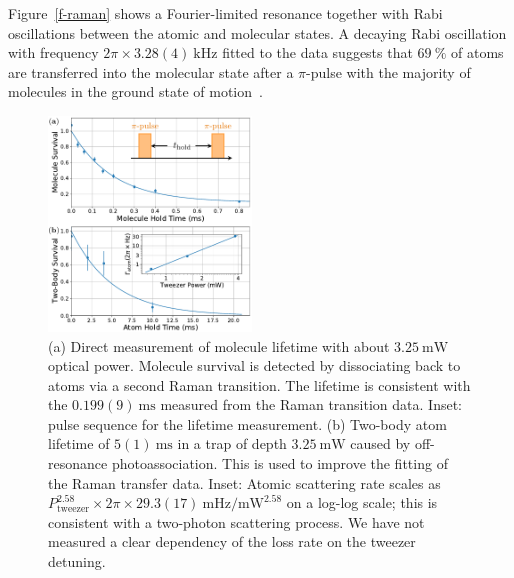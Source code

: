 \documentclass[aps,prl,twocolumn,10pt,superscriptaddress]{revtex4-1}
\begin{document}
Figure~\ref{f-raman} shows a Fourier-limited resonance together with Rabi oscillations between the atomic and molecular states.
A decaying Rabi oscillation with frequency $2\pi\times3.28(4)~\mathrm{kHz}$ fitted to the data suggests that
$69~\mathrm{\%}$ of atoms are transferred into the molecular state after a $\pi$-pulse with the majority of molecules in the ground state of motion~\cite{Zhang2020,He331}.



\begin{figure}[t!]
  \includegraphics[width=0.48\textwidth]{imgs/fig-lifetime.pdf}
  \caption{
    (a) Direct measurement of molecule lifetime with about $3.25~\mathrm{mW}$ optical power.
    Molecule survival is detected by dissociating back to atoms via a second Raman transition.
    The lifetime is consistent with the $0.199(9)~\mathrm{ms}$
    measured from the Raman transition data.
    Inset: pulse sequence for the lifetime measurement.
    (b) Two-body atom lifetime of $5(1)~\mathrm{ms}$
    in a trap of depth $3.25~\mathrm{mW}$ caused by off-resonance photoassociation.
    This is used to improve the fitting of the Raman transfer data.
    Inset: Atomic scattering rate scales as
    $P_\textrm{tweezer}^{2.58}\times\!2\pi\!\times29.3(17)~\mathrm{mHz/mW^{2.58}}$ on a log-log scale;
    this is consistent with a two-photon scattering process.
    We have not measured a clear dependency of the loss rate on the tweezer detuning.
    \label{f-lifetime}}
\end{figure}
\end{document}
